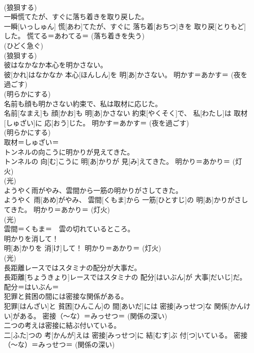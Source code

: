 \documentclass[8pt]{extreport}
\begin{document}
\begin{CJK}{UTF8}{min}
{\\	(狼狽する)
\\	一瞬慌てたが、すぐに落ち着きを取り戻した。	
\\	一瞬[いっしゅん] 慌[あわ]てたが、すぐに 落ち着[おちつ]きを 取り戻[とりもど]した。	慌てる＝あわてる＝ (落ち着きを失う) 
\\	(ひどく急ぐ) 
\\	(狼狽する)
\\	彼はなかなか本心を明かさない。	
\\	彼[かれ]はなかなか 本心[ほんしん]を 明[あ]かさない。	明かす＝あかす＝ (夜を過ごす) 
\\	(明らかにする) 
\\	名前も顔も明かさない約束で、私は取材に応じた。	
\\	名前[なまえ]も 顔[かお]も 明[あ]かさない 約束[やくそく]で、 私[わたし]は 取材[しゅざい]に 応[おう]じた。	明かす＝あかす＝ (夜を過ごす) 
\\	(明らかにする) 
\\	取材＝しゅざい＝ 
\\	トンネルの向こうに明かりが見えてきた。	
\\	トンネルの 向[む]こうに 明[あ]かりが 見[み]えてきた。	明かり＝あかり＝ (灯火) 
\\	(光) 
\\	ようやく雨がやみ、雲間から一筋の明かりがさしてきた。	
\\	ようやく 雨[あめ]がやみ、 雲間[くもま]から 一筋[ひとすじ]の 明[あ]かりがさしてきた。	明かり＝あかり＝ (灯火) 
\\	(光) 
\\	雲間＝くもま＝　雲の切れているところ。
\\	明かりを消して！	
\\	明[あ]かりを 消[け]して！	明かり＝あかり＝ (灯火) 
\\	(光) 
\\	長距離レースではスタミナの配分が大事だ。	
\\	長距離[ちょうきょり]レースではスタミナの 配分[はいぶん]が 大事[だいじ]だ。	配分＝はいぶん＝ 
\\	犯罪と貧困の間には密接な関係がある。	
\\	犯罪[はんざい]と 貧困[ひんこん]の 間[あいだ]には 密接[みっせつ]な 関係[かんけい]がある。	密接（〜な）＝みっせつ＝ (関係の深い) 
\\	二つの考えは密接に結ぶ付いている。	
\\	二[ふた]つの 考[かんが]えは 密接[みっせつ]に 結[むす]ぶ 付[つ]いている。	密接（〜な）＝みっせつ＝ (関係の深い) 
}
\end{CJK}
\end{document}
